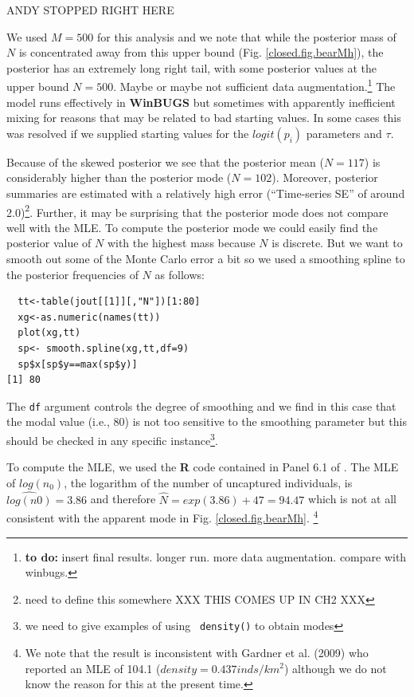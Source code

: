 ANDY STOPPED RIGHT HERE

We used $M=500$ for this analysis and we
note that  while the posterior mass of $N$ is concentrated away from this
upper bound (Fig. \ref{closed.fig.bearMh}), the posterior has an
extremely long right tail, with some posterior values at the upper
bound $N=500$. Maybe or
maybe not sufficient data augmentation.\footnote{
{\bf to do: } insert final results. longer run. more data
augmentation. compare with winbugs.
}
The model runs effectively in {\bf WinBUGS} but sometimes with apparently
inefficient mixing for reasons that may be related to bad starting
values. In some cases this was resolved if we supplied starting values
for the $logit(p_{i})$ parameters and $\tau$.


Because of the skewed posterior we see that the posterior mean ($N=117$)
is
considerably higher than the posterior mode ($N=102$). Moreover, 
posterior summaries are estimated with a relatively high error
(``Time-series SE'' of around 2.0)\footnote{need to define this somewhere XXX THIS COMES UP IN CH2 XXX}.
Further, it may be surprising that the posterior mode does not compare
well with the MLE. To compute the posterior mode we could easily find
the posterior value of $N$ with the highest mass because $N$ is
discrete. But we want to smooth out some of the Monte Carlo error a
bit so we used a smoothing spline to the posterior frequencies of $N$
as follows:
\begin{verbatim}
  tt<-table(jout[[1]][,"N"])[1:80]
  xg<-as.numeric(names(tt))
  plot(xg,tt)
  sp<- smooth.spline(xg,tt,df=9)
  sp$x[sp$y==max(sp$y)]
[1] 80
\end{verbatim}
The \mbox{\tt df} argument controls the degree of smoothing and we
find in this case that the modal value (i.e., 80) is not too sensitive
to the smoothing parameter but this should be checked in any specific
instance\footnote{we need to give examples of using \mbox{\tt
    density()} to obtain modes}.

To compute the MLE, we used 
the {\bf R} code contained in Panel 6.1 of \citet{royle_dorazio:2008}.  The
MLE of $log(n_{0})$, the logarithm of the number of uncaptured
individuals, is $\widehat{log(n0)} = 3.86$ and therefore $\hat{N} =
exp(3.86)+47 = 94.47$ which is not at all consistent with the apparent
mode in 
Fig. \ref{closed.fig.bearMh}.
\footnote{We note that the result is inconsistent with Gardner et
  al. (2009) who reported an MLE of 104.1 ($density = 0.437
  inds/km^2$) although we do not know the reason for this at the
  present time.}  


